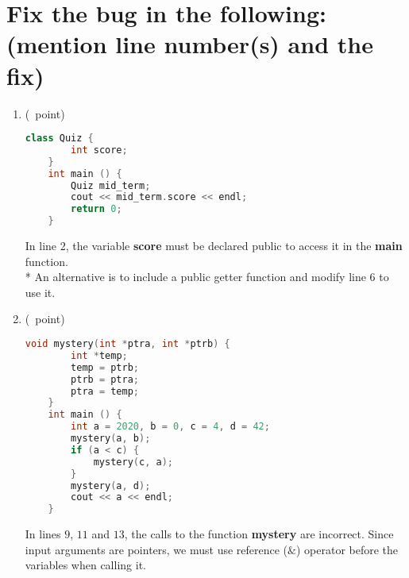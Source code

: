 \documentclass[14pt]{article}
\begin{document}
\section{Fix the bug in the following: (mention line number(s) and the fix)}
\begin{enumerate}[label=\alph*]
    \item (\textonequarter\ point)
    \begin{lstlisting}[language=C++, title={Part (a)}]
    class Quiz {
        int score;
    }
    int main () {
        Quiz mid_term;
        cout << mid_term.score << endl;
        return 0;
    }
    \end{lstlisting}
    \begin{myframe}[width=500pt,height=50pt,top=2pt,bottom=2.5pt,left=2pt,right=2pt,arc=10pt,auto outer arc]
    In line 2, the variable \textbf{score} must be declared public to access it in the \textbf{main} function. \\*
    An alternative is to include a public getter function and modify line 6 to use it.
    \end{myframe}
    
    \item (\textonequarter\ point)
    \begin{lstlisting}[language=C++, title={Part (b)}]
    void mystery(int *ptra, int *ptrb) {
        int *temp;
        temp = ptrb;
        ptrb = ptra;
        ptra = temp;
    }
    int main () {
        int a = 2020, b = 0, c = 4, d = 42;
        mystery(a, b);
        if (a < c) {
            mystery(c, a);
        }
        mystery(a, d);
        cout << a << endl;
    }
    \end{lstlisting}
    \begin{myframe}[width=500pt,height=50pt,top=2pt,bottom=2.5pt,left=2pt,right=2pt,arc=10pt,auto outer arc]
    In lines $9$, $11$ and $13$, the calls to the function \textbf{mystery} are incorrect. Since input arguments are pointers, we must use reference ($\&$) operator before the variables when calling it.
    \end{myframe}
    
\end{enumerate}
\end{document}
